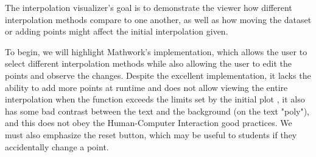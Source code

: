 The interpolation visualizer's goal is to demonstrate the viewer how different interpolation methods compare to one another, as well as how moving the dataset or adding points might affect the initial interpolation given.

To begin, we will highlight Mathwork's implementation, which allows the user to select different interpolation methods while also allowing the user to edit the points and observe the changes. Despite the excellent implementation, it lacks the ability to add more points at runtime and does not allow viewing the entire interpolation when the function exceeds the limits set by the initial plot ,  it also has some bad contrast between the text and the background (on the text "poly"), and this does not obey the Human-Computer Interaction good practices. We must also emphasize the reset button, which may be useful to students if they accidentally change a point. 

